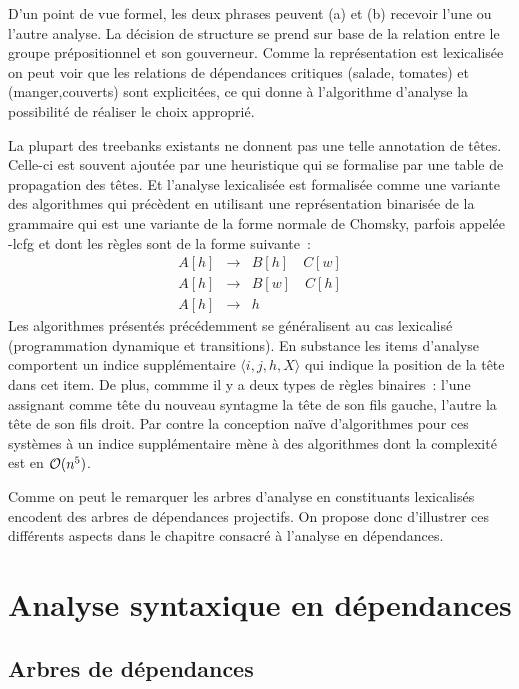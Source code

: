 \documentclass[11pt,openany]{book}
\begin{document}
D'un point de vue formel, les deux phrases peuvent (a) et (b) recevoir l'une ou l'autre analyse. La décision de structure se prend
 sur base de la relation entre le groupe prépositionnel et son gouverneur.
Comme la représentation est lexicalisée on peut voir que les relations de dépendances critiques (salade, tomates) et (manger,couverts)
sont explicitées, ce qui donne à l'algorithme d'analyse la possibilité de réaliser le choix approprié.

La plupart des treebanks existants ne donnent pas une telle annotation de têtes.
Celle-ci est souvent ajoutée par une heuristique qui se formalise par une table de propagation des têtes.
Et l'analyse lexicalisée est formalisée comme une variante des algorithmes qui précèdent en utilisant une représentation 
binarisée de la grammaire qui est une variante de la forme normale de Chomsky,
parfois appelée {-lcfg} et dont les règles sont de la forme suivante~:
\begin{eqnarray*}
A [h] &\rightarrow & B[h]\quad C[w]\\
A [h] &\rightarrow & B[w]\quad C[h]\\
A[h] &\rightarrow & h
\end{eqnarray*}
Les algorithmes présentés précédemment se généralisent au cas lexicalisé (programmation dynamique et transitions). En substance les items d'analyse 
comportent un indice supplémentaire $\langle i,j,h, X\rangle$ qui indique la position de la tête dans cet item.
De plus, commme il y a deux types de règles binaires~: l'une assignant comme tête du nouveau syntagme la tête de son fils gauche, l'autre la tête de son fils droit.
Par contre la conception naïve d'algorithmes pour ces systèmes à un indice supplémentaire mène à des algorithmes dont la complexité est en 
${\cal O}(n^5)$.

Comme on peut le remarquer les arbres d'analyse en constituants lexicalisés encodent des 
arbres de dépendances projectifs. On propose donc d'illustrer ces différents aspects
dans le chapitre consacré à l'analyse en dépendances.


\chapter{Analyse syntaxique en dépendances}

\section{Arbres de dépendances}
\end{document}
